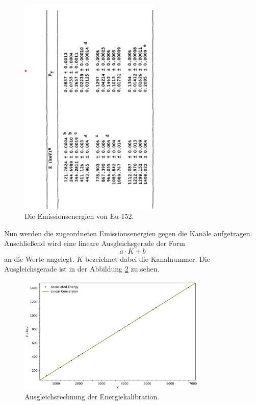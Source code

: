 \begin{figure}[H]
    \centering
    \includegraphics[angle=270,width=0.6\textwidth]{content/grafik/euenergien.jpg}
    \caption{Die Emissionsenergien von Eu-152. \cite{Kalibration}}
    \label{fig:euE}
\end{figure}

Nun werden die zugeordneten Emissionsenergien gegen die Kanäle aufgetragen.
Anschließend wird eine lineare Ausgleichsgerade der Form 
\begin{equation*}
    a \cdot K + b
\end{equation*}
an die Werte angelegt. $K$ bezeichnet dabei die Kanalnummer.
Die Ausgleichsgerade ist in der Abbildung \ref{fig:plot2}
zu sehen.

\begin{figure}[H]
    \centering
    \includegraphics[width=0.8\textwidth]{content/plots/plot2.jpg}
    \caption{Ausgleichsrechnung der Energiekalibration.}
    \label{fig:plot2}
\end{figure}

